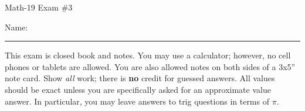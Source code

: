 \documentclass[letterpaper,12pt,fleqn]{article}
\begin{document}
\begin{center}
\Large Math-19 Exam \#3
\end{center}

\vspace{0.25in}

Name: \rule{4in}{1pt}

\vspace{0.25in}

This exam is closed book and notes. You may use a calculator; however, no cell
phones or tablets are allowed. You are also allowed notes on both sides of a
3x5'' note card. Show \emph{all} work; there is \textbf{no} credit for guessed
answers. All values should be exact unless you are specifically asked for an
approximate value answer.  In particular, you may leave answers to trig
questions in terms of $\pi$.

\vspace{0.25in}
\end{document}
